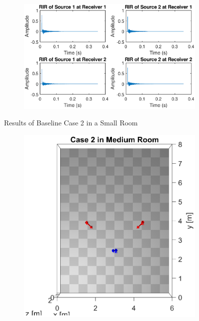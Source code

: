 \documentclass[a4paper,twoside,12pt,hidelinks]{article}
\begin{document}
\begin{appendices}
\begin{figure}[H]
\begin{subfigure}[H]{0.6\textwidth}
\includegraphics[width=\textwidth]{2s_ir}
\end{subfigure}
\caption{Results of Baseline Case 2 in a Small Room}
\end{figure}
\begin{figure}[H]
\centering
\begin{subfigure}[H]{0.35\textwidth}
\includegraphics[width=\textwidth]{2m_lo}
\end{subfigure}
\begin{subfigure}[H]{0.6\textwidth}

\end{subfigure}
\end{figure}
\end{appendices}
\end{document}
